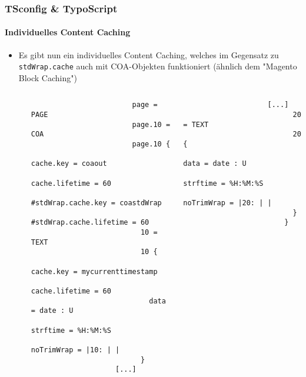 \begin{frame}[fragile]
	\frametitle{TSconfig \& TypoScript}
	\framesubtitle{Individuelles Content Caching}

	\lstset{basicstyle=\tiny\ttfamily}

	\begin{itemize}

		\item Es gibt nun ein individuelles Content Caching, welches im Gegensatz zu \texttt{stdWrap.cache}
			auch mit COA-Objekten funktioniert (ähnlich dem "Magento Block Caching")

			\begin{columns}[T]
				\begin{column}{.07\textwidth}
                \end{column}
				\begin{column}{.465\textwidth}
					\begin{lstlisting}
						page = PAGE
						page.10 = COA
						page.10 {
						  cache.key = coaout
						  cache.lifetime = 60
						  #stdWrap.cache.key = coastdWrap
						  #stdWrap.cache.lifetime = 60
						  10 = TEXT
						  10 {
						    cache.key = mycurrenttimestamp
						    cache.lifetime = 60
						    data = date : U
						    strftime = %H:%M:%S
						    noTrimWrap = |10: | |
						  }
					[...]
					\end{lstlisting}
				\end{column}

				\begin{column}{.465\textwidth}
					\begin{lstlisting}
					[...]
						  20 = TEXT
						  20 {
						    data = date : U
						    strftime = %H:%M:%S
						    noTrimWrap = |20: | |
						  }
						}
					\end{lstlisting}

				\end{column}
			\end{columns}

	\end{itemize}

\end{frame}


